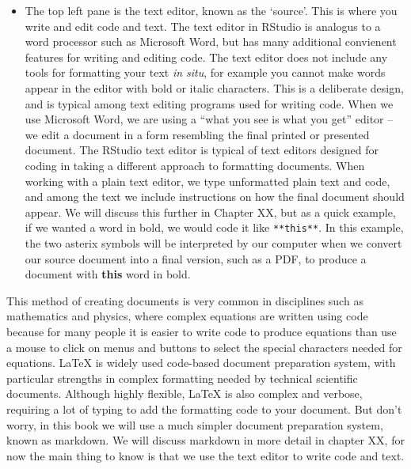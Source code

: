 \documentclass[]{book}
\providecommand{\tightlist}{%
  \setlength{\itemsep}{0pt}\setlength{\parskip}{0pt}}
\begin{document}
\begin{itemize}
\tightlist
\item
  The top left pane is the text editor, known as the `source'. This is
  where you write and edit code and text. The text editor in RStudio is
  analogus to a word processor such as Microsoft Word, but has many
  additional convienent features for writing and editing code. The text
  editor does not include any tools for formatting your text \emph{in
  situ}, for example you cannot make words appear in the editor with
  bold or italic characters. This is a deliberate design, and is typical
  among text editing programs used for writing code. When we use
  Microsoft Word, we are using a ``what you see is what you get'' editor
  -- we edit a document in a form resembling the final printed or
  presented document. The RStudio text editor is typical of text editors
  designed for coding in taking a different approach to formatting
  documents. When working with a plain text editor, we type unformatted
  plain text and code, and among the text we include instructions on how
  the final document should appear. We will discuss this further in
  Chapter XX, but as a quick example, if we wanted a word in bold, we
  would code it like \texttt{**this**}. In this example, the two asterix
  symbols will be interpreted by our computer when we convert our source
  document into a final version, such as a PDF, to produce a document
  with \textbf{this} word in bold.
\end{itemize}

This method of creating documents is very common in disciplines such as
mathematics and physics, where complex equations are written using code
because for many people it is easier to write code to produce equations
than use a mouse to click on menus and buttons to select the special
characters needed for equations. LaTeX is widely used code-based
document preparation system, with particular strengths in complex
formatting needed by technical scientific documents. Although highly
flexible, LaTeX is also complex and verbose, requiring a lot of typing
to add the formatting code to your document. But don't worry, in this
book we will use a much simpler document preparation system, known as
markdown. We will discuss markdown in more detail in chapter XX, for now
the main thing to know is that we use the text editor to write code and
text.
\end{document}
